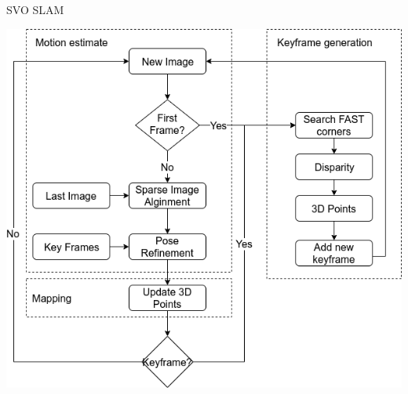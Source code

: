 \documentclass[aspectratio=169]{beamer}
\begin{document}
\begin{frame}{SVO SLAM}
  \begin{center}
    \includegraphics[height=0.9\textheight]{../img/our_svo_slam.png}
  \end{center}
\end{frame}
\end{document}
